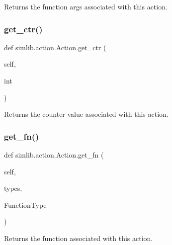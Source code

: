 \begin{DoxyVerb}Returns the function args associated with this action.
\end{DoxyVerb}
 \mbox{\label{classsimlib_1_1action_1_1_action_a9d3d09c4547aa4bb649f1ccc168ebd3b}} 
\subsubsection{\texorpdfstring{get\+\_\+ctr()}{get\_ctr()}}
{\footnotesize\ttfamily def simlib.\+action.\+Action.\+get\+\_\+ctr (\begin{DoxyParamCaption}\item[{}]{self,  }\item[{}]{int }\end{DoxyParamCaption})}

\begin{DoxyVerb}Returns the counter value associated with this action.
\end{DoxyVerb}
 \mbox{\label{classsimlib_1_1action_1_1_action_ab9a687eb0392442ddf3ea24216115eab}} 
\subsubsection{\texorpdfstring{get\+\_\+fn()}{get\_fn()}}
{\footnotesize\ttfamily def simlib.\+action.\+Action.\+get\+\_\+fn (\begin{DoxyParamCaption}\item[{}]{self,  }\item[{}]{types,  }\item[{}]{Function\+Type }\end{DoxyParamCaption})}

\begin{DoxyVerb}Returns the function associated with this action.
\end{DoxyVerb}
 \mbox{\label{classsimlib_1_1action_1_1_action_a5043b6debec6f1486a449b0393351353}} 
